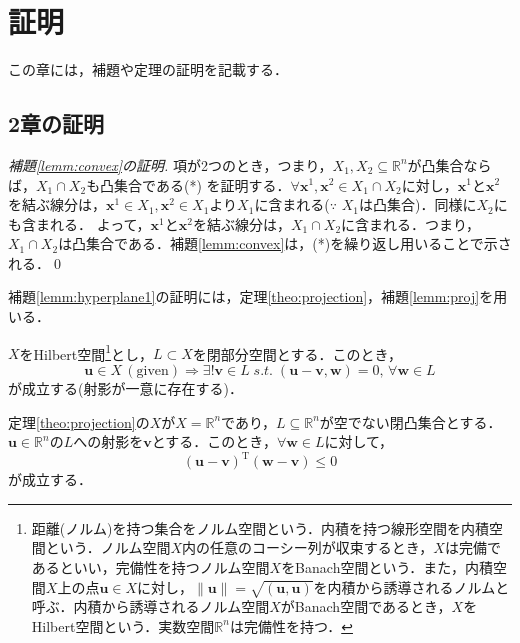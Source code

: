 \documentclass[dvipdfmx]{jsreport}
\begin{document}
\chapter{証明}
この章には，補題や定理の証明を記載する．
\section{2章の証明}
\begin{proof}[補題\ref{lemm:convex}の証明]
  項が2つのとき，つまり，$X_1, X_2 \subseteq \mathbb{R}^n$が凸集合ならば，$X_1 \cap X_2$も凸集合である(*)
  を証明する．$\forall \bm{x}^1, \bm{x}^2 \in X_1 \cap X_2$に対し，$\bm{x}^1$と$\bm{x}^2$を結ぶ線分は，$\bm{x}^1 \in X_1, \bm{x}^2 \in X_1$より$X_1$に含まれる($\because$ $X_1$は凸集合)．同様に$X_2$にも含まれる．
  よって，$\bm{x}^1$と$\bm{x}^2$を結ぶ線分は，$X_1 \cap X_2$に含まれる．つまり，$X_1 \cap X_2$は凸集合である．補題\ref{lemm:convex}は，(*)を繰り返し用いることで示される．\qed
\end{proof}

補題\ref{lemm:hyperplane1}の証明には，定理\ref{theo:projection}，補題\ref{lemm:proj}を用いる．

\begin{theo}[射影定理]\label{theo:projection}
  $X$をHilbert空間\footnote{距離(ノルム)を持つ集合をノルム空間という．内積を持つ線形空間を内積空間という．ノルム空間$X$内の任意のコーシー列が収束するとき，$X$は完備であるといい，完備性を持つノルム空間$X$をBanach空間という．また，内積空間$X$上の点$\bm{u} \in X$に対し，$\|\bm{u}\| = \sqrt{(\bm{u}, \bm{u})}$を内積から誘導されるノルムと呼ぶ．内積から誘導されるノルム空間$X$がBanach空間であるとき，$X$をHilbert空間という．実数空間$\mathbb{R}^n$は完備性を持つ．}とし，$L \subset X$を閉部分空間とする．このとき，
  \begin{equation}
    \bm{u} \in X \, (\mathrm{given}) \Rightarrow \exists! \bm{v} \in L \; s.t. \; (\bm{u} - \bm{v}, \bm{w}) = 0, \, \forall \bm{w} \in L \nonumber
  \end{equation}
  が成立する(射影が一意に存在する)．
\end{theo}

\begin{lemm}\label{lemm:proj}
    定理\ref{theo:projection}の$X$が$X = \mathbb{R}^n$であり，$L \subseteq \mathbb{R}^n$が空でない閉凸集合とする．$\bm{u} \in \mathbb{R}^n$の$L$への射影を$\bm{v}$とする．このとき，$\forall \bm{w} \in L$に対して，
  \begin{equation}\label{eq:proj}
    (\bm{u} - \bm{v})^{\mathrm{T}} (\bm{w} - \bm{v}) \leq 0
  \end{equation}
  が成立する．
\end{lemm}
\end{document}
